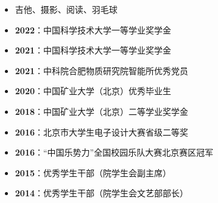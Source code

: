   \begin{itemize}[leftmargin=*]
    \item 吉他、摄影、阅读、羽毛球
    \item \textbf{2022}：中国科学技术大学一等学业奖学金
    \item \textbf{2021}：中国科学技术大学一等学业奖学金
    \item \textbf{2021}：中科院合肥物质研究院智能所优秀党员
    \item \textbf{2020}：中国矿业大学（北京）优秀毕业生
    \item \textbf{2018}：中国矿业大学（北京）二等学业奖学金
    \item \textbf{2016}：北京市大学生电子设计大赛省级二等奖
    \item \textbf{2016}：“中国乐势力”全国校园乐队大赛北京赛区冠军
    \item \textbf{2015}：优秀学生干部（院学生会副主席）
    \item \textbf{2014}：优秀学生干部（院学生会文艺部部长）
  \end{itemize}
